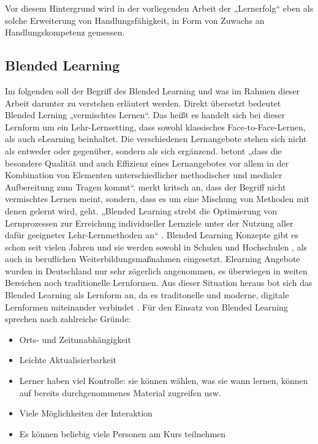\documentclass[12pt, bibliography=totoc]{scrartcl}
\begin{document}
Vor diesem Hintergrund wird in der vorliegenden Arbeit der „Lernerfolg``
eben als solche Erweiterung von Handlungsfähigkeit, in Form von Zuwachs
an Handlungskompetenz gemessen.

\subsection{Blended Learning}\label{blended-learning}

Im folgenden soll der Begriff des Blended Learning und was im Rahmen
dieser Arbeit darunter zu verstehen erläutert werden. Direkt übersetzt
bedeutet Blended Lerning „vermischtes Lernen``. Das heißt es handelt
sich bei dieser Lernform um ein Lehr-Lernsetting, dass sowohl
klassisches Face-to-Face-Lernen, als auch eLearning beinhaltet. Die
verschiedenen Lernangebote stehen sich nicht als entweder oder
gegenüber, sondern als sich ergänzend.
\textcite[3]{kerres2001multimediale} betont „dass die besondere Qualität
und auch Effizienz eines Lernangebotes vor allem in der Kombination von
Elementen unterschiedlicher methodischer und medialer Aufbereitung zum
Tragen kommt``. \textcite[45]{ehlers2011qualitat} merkt kritsch an, dass
der Begriff nicht vermischtes Lernen meint, sondern, dass es um eine
Mischung von Methoden mit denen gelernt wird, geht. „Blended Learning
strebt die Optimierung von Lernprozessen zur Erreichung individueller
Lernziele unter der Nutzung aller dafür geeigneter Lehr-Lernmethoden
an`` \parencite[46]{ehlers2011qualitat}. Blended Learning Konzepte gibt
es schon seit vielen Jahren und sie werden sowohl in Schulen und
Hochschulen , als auch in beruflichen Weiterbildungsmaßnahmen
eingesetzt. Elearning Angebote wurden in Deutschland nur sehr zögerlich
angenommen, es überwiegen in weiten Bereichen noch traditionelle
Lernformen. Aus dieser Situation heraus bot sich das Blended Learning
als Lernform an, da es traditonelle und moderne, digitale Lernformen
miteinander verbindet \parencite{Maihack2015}. Für den Einsatz von
Blended Learning sprechen nach \textcite{thomas2000evaluating}
zahlreiche Gründe:


\begin{itemize}
\item
  Orts- und Zeitunabhängigkeit
\item
  Leichte Aktualisierbarkeit
\item
  Lerner haben viel Kontrolle: sie können wählen, was sie wann lernen,
  können auf bereits durchgenommenes Material zugreifen usw.
\item
  Viele Möglichkeiten der Interaktion
\item
  Es können beliebig viele Personen am Kurs teilnehmen
\end{itemize}
\end{document}
